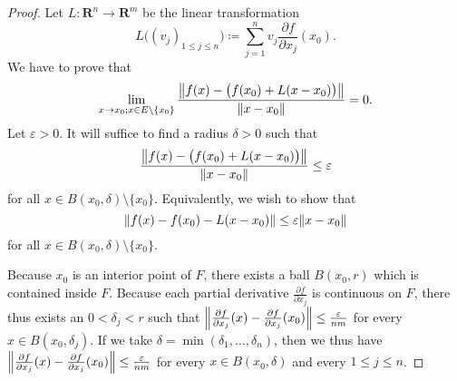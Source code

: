 \begin{proof}
    Let \(L : \mathbf{R}^n \to \mathbf{R}^m\) be the linear transformation
    \[
        L\big((v_j)_{1 \leq j \leq n}\big) \coloneqq \sum_{j = 1}^n v_j \frac{\partial f}{\partial x_j}(x_0).
    \]
    We have to prove that
    \[
        \lim_{x \to x_0 ; x \in E \setminus \{x_0\}} \frac{\norm*{f(x) - \big(f(x_0) + L(x - x_0)\big)}}{\norm*{x - x_0}} = 0.
    \]
    Let \(\varepsilon > 0\).
    It will suffice to find a radius \(\delta > 0\) such that
    \[
        \frac{\norm*{f(x) - \big(f(x_0) + L(x - x_0)\big)}}{\norm*{x - x_0}} \leq \varepsilon
    \]
    for all \(x \in B(x_0, \delta) \setminus \{x_0\}\).
    Equivalently, we wish to show that
    \[
        \norm*{f(x) - f(x_0) - L(x - x_0)} \leq \varepsilon \norm*{x - x_0}
    \]
    for all \(x \in B(x_0, \delta) \setminus \{x_0\}\).

    Because \(x_0\) is an interior point of \(F\), there exists a ball \(B(x_0, r)\) which is contained inside \(F\).
    Because each partial derivative \(\frac{\partial f}{\partial x_j}\) is continuous on \(F\), there thus exists an \(0 < \delta_j < r\) such that \(\norm*{\frac{\partial f}{\partial x_j}(x) - \frac{\partial f}{\partial x_j}(x_0)} \leq \frac{\varepsilon}{nm}\) for every \(x \in B(x_0, \delta_j)\).
    If we take \(\delta = \min(\delta_1, \dots, \delta_n)\), then we thus have \(\norm*{\frac{\partial f}{\partial x_j}(x) - \frac{\partial f}{\partial x_j}(x_0)} \leq \frac{\varepsilon}{nm}\) for every \(x \in B(x_0, \delta)\) and every \(1 \leq j \leq n\).


\end{proof}
